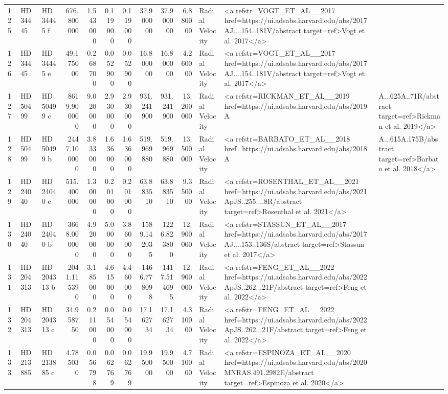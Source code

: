 \begin{tabular}{lllrrrrrrrll}
125 & HD 34445 & HD 34445 f & 676.800000 & 1.543000 & 0.119000 & 0.119000 & 37.900000 & 37.900000 & 6.880000 & Radial Velocity & <a refstr=VOGT_ET_AL__2017 href=https://ui.adsabs.harvard.edu/abs/2017AJ....154..181V/abstract target=ref>Vogt et al. 2017</a> \\
126 & HD 34445 & HD 34445 e & 49.175000 & 0.268700 & 0.052900 & 0.052900 & 16.800000 & 16.800000 & 4.260000 & Radial Velocity & <a refstr=VOGT_ET_AL__2017 href=https://ui.adsabs.harvard.edu/abs/2017AJ....154..181V/abstract target=ref>Vogt et al. 2017</a> \\
127 & HD 50499 & HD 50499 c & 8619.900000 & 9.020000 & 2.930000 & 2.930000 & 931.241900 & 931.241900 & 13.200000 & Radial Velocity & <a refstr=RICKMAN_ET_AL__2019 href=https://ui.adsabs.harvard.edu/abs/2019A&A...625A..71R/abstract target=ref>Rickman et al. 2019</a> \\
128 & HD 50499 & HD 50499 b & 2447.100000 & 3.833000 & 1.636000 & 1.636000 & 519.969880 & 519.969880 & 13.500000 & Radial Velocity & <a refstr=BARBATO_ET_AL__2018 href=https://ui.adsabs.harvard.edu/abs/2018A&A...615A.175B/abstract target=ref>Barbato et al. 2018</a> \\
129 & HD 24040 & HD 24040 c & 515.400000 & 1.300000 & 0.201000 & 0.201000 & 63.883510 & 63.883510 & 9.350000 & Radial Velocity & <a refstr=ROSENTHAL_ET_AL__2021 href=https://ui.adsabs.harvard.edu/abs/2021ApJS..255....8R/abstract target=ref>Rosenthal et al. 2021</a> \\
130 & HD 24040 & HD 24040 b & 3668.000000 & 4.920000 & 5.000000 & 3.860000 & 1589.142035 & 1226.823800 & 12.900000 & Radial Velocity & <a refstr=STASSUN_ET_AL__2017 href=https://ui.adsabs.harvard.edu/abs/2017AJ....153..136S/abstract target=ref>Stassun et al. 2017</a> \\
131 & HD 204313 & HD 204313 b & 2041.115390 & 3.185000 & 4.615000 & 4.460000 & 1466.778098 & 1417.514695 & 12.900000 & Radial Velocity & <a refstr=FENG_ET_AL__2022 href=https://ui.adsabs.harvard.edu/abs/2022ApJS..262...21F/abstract target=ref>Feng et al. 2022</a> \\
132 & HD 204313 & HD 204313 c & 34.958750 & 0.211000 & 0.054000 & 0.054000 & 17.162734 & 17.162734 & 4.310000 & Radial Velocity & <a refstr=FENG_ET_AL__2022 href=https://ui.adsabs.harvard.edu/abs/2022ApJS..262...21F/abstract target=ref>Feng et al. 2022</a> \\
133 & HD 213885 & HD 213885 c & 4.785030 & 0.056798 & 0.062769 & 0.062769 & 19.950000 & 19.950000 & 4.710000 & Radial Velocity & <a refstr=ESPINOZA_ET_AL__2020 href=https://ui.adsabs.harvard.edu/abs/2020MNRAS.491.2982E/abstract target=ref>Espinoza et al. 2020</a> \\

\end{tabular}
